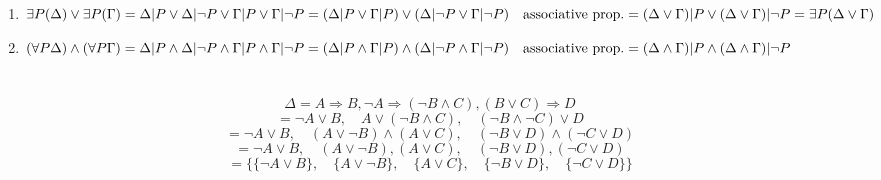 \documentclass{article}
\begin{document}
\section{}
\renewcommand{\labelenumi}{(\alph{enumi})}
 \begin{enumerate}
   \item $\exists P (\Delta) \lor \exists P (\Gamma) \\
   = \Delta | P \lor \Delta | \lnot P \lor \Gamma | P \lor \Gamma | \lnot P \\
   = (\Delta | P \lor \Gamma | P) \lor (\Delta | \lnot P \lor \Gamma | \lnot P) \quad \textrm{associative prop.}\\
   = (\Delta \lor \Gamma) | P \lor (\Delta \lor \Gamma) | \lnot P \\
   = \exists P (\Delta \lor \Gamma) $
   \item $ (\forall P \Delta) \land (\forall P \Gamma) \\
   = \Delta | P \land \Delta | \lnot P \land \Gamma | P \land \Gamma | \lnot P \\
   = (\Delta | P \land \Gamma | P) \land (\Delta | \lnot P \land \Gamma | \lnot P) \quad \textrm{associative prop.}\\
   = (\Delta \land \Gamma) | P \land (\Delta \land \Gamma) | \lnot P$
 \end{enumerate}
 
 \section{}
 \[\Delta = A \Rightarrow B, \lnot A \Rightarrow (\lnot B \land C), (B \lor C) \Rightarrow D\]
 \[= \lnot A \lor B, \quad A \lor (\lnot B \land C), \quad (\lnot B \land \lnot C) \lor D\]
 \[= \lnot A \lor B, \quad (A \lor \lnot B) \land (A \lor C), \quad (\lnot B \lor D) \land (\lnot C \lor D)\]
 \[= \lnot A \lor B, \quad (A \lor \lnot B), (A \lor C), \quad (\lnot B \lor D), (\lnot C \lor D)\]
 \[= \{\{\lnot A \lor B\}, \quad \{A \lor \lnot B\}, \quad \{A \lor C\}, \quad \{\lnot B \lor D\}, \quad \{\lnot C \lor D\}\}\]
 
\end{document}
